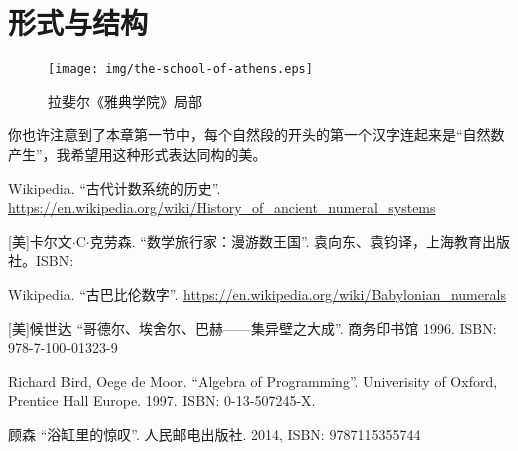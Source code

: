 \documentclass[UTF8]{article}
\begin{document}
\section{形式与结构}

\begin{figure}[htbp]
 \centering
 \texttt{[image: img/the-school-of-athens.eps]}
 \caption{拉斐尔《雅典学院》局部}
 \label{fig:the-school-of-athens}
\end{figure}

你也许注意到了本章第一节中，每个自然段的开头的第一个汉字连起来是“自然数产生”，我希望用这种形式表达同构的美。

\ifx\wholebook\relax \else
\begin{thebibliography}{99}

Wikipedia. ``古代计数系统的历史''. \url{https://en.wikipedia.org/wiki/History_of_ancient_numeral_systems}

[美]卡尔文$\cdot$C$\cdot$克劳森. ``数学旅行家：漫游数王国''. 袁向东、袁钧译，上海教育出版社。ISBN:

Wikipedia. ``古巴比伦数字''. \url{https://en.wikipedia.org/wiki/Babylonian_numerals}

[美]候世达 ``哥德尔、埃舍尔、巴赫——集异壁之大成''. 商务印书馆 1996. ISBN: 978-7-100-01323-9

Richard Bird, Oege de Moor. ``Algebra of Programming''. Univerisity of Oxford, Prentice Hall Europe. 1997. ISBN: 0-13-507245-X.

顾森 ``浴缸里的惊叹''. 人民邮电出版社. 2014, ISBN: 9787115355744

\end{thebibliography}

\expandafter\enddocument

\fi
\end{document}
